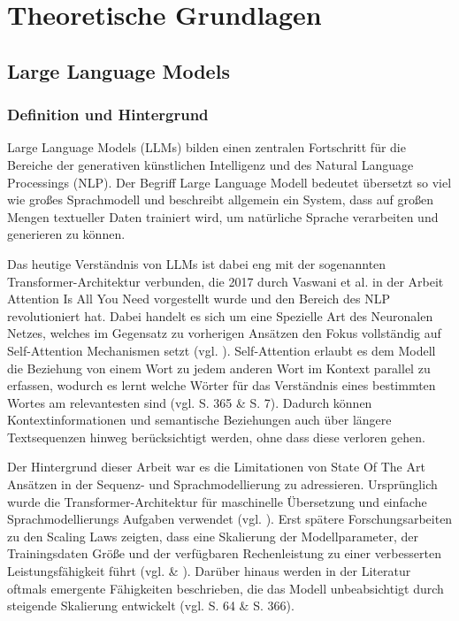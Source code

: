 \section{Theoretische Grundlagen}

\subsection{Large Language Models}

\subsubsection{Definition und Hintergrund}

Large Language Models (LLMs) bilden einen zentralen Fortschritt für die Bereiche der generativen künstlichen Intelligenz und des Natural Language Processings (NLP). Der Begriff Large Language Modell bedeutet übersetzt so viel wie großes Sprachmodell und beschreibt allgemein ein System, dass auf großen Mengen textueller Daten trainiert wird, um natürliche Sprache verarbeiten und generieren zu können. 

Das heutige Verständnis von LLMs ist dabei eng mit der sogenannten Transformer-Architektur verbunden, die 2017 durch Vaswani et al. in der Arbeit Attention Is All You Need vorgestellt wurde und den Bereich des NLP revolutioniert hat. Dabei handelt es sich um eine Spezielle Art des Neuronalen Netzes, welches im Gegensatz zu vorherigen Ansätzen den Fokus vollständig auf Self-Attention Mechanismen setzt (vgl. \cite{Attention_is_all_you_need}). Self-Attention erlaubt es dem Modell die Beziehung von einem Wort zu jedem anderen Wort im Kontext parallel zu erfassen, wodurch es lernt welche Wörter für das Verständnis eines bestimmten Wortes am relevantesten sind (vgl. \cite{Evolution_im_Dialog} S. 365 \& \cite{A_Survey_of_llms_techniques_apps_and_challenges} S. 7). Dadurch können Kontextinformationen und semantische Beziehungen auch über längere Textsequenzen hinweg berücksichtigt werden, ohne dass diese verloren gehen. 

Der Hintergrund dieser Arbeit war es die Limitationen von State Of The Art Ansätzen in der Sequenz- und Sprachmodellierung zu adressieren. Ursprünglich wurde die Transformer-Architektur für maschinelle Übersetzung und einfache Sprachmodellierungs Aufgaben verwendet (vgl. \cite{Attention_is_all_you_need}). Erst spätere Forschungsarbeiten zu den Scaling Laws zeigten, dass eine Skalierung der Modellparameter, der Trainingsdaten Größe und der verfügbaren Rechenleistung zu einer verbesserten Leistungsfähigkeit führt (vgl. \cite{kaplan_scaling_2020} \& \cite{chen2026surveyscalinglargelanguage}). Darüber hinaus werden in der Literatur oftmals emergente Fähigkeiten beschrieben, die das Modell unbeabsichtigt durch steigende Skalierung entwickelt (vgl. \cite{xiao2025foundationslargelanguagemodels} S. 64 \& \cite{Evolution_im_Dialog} S. 366).


